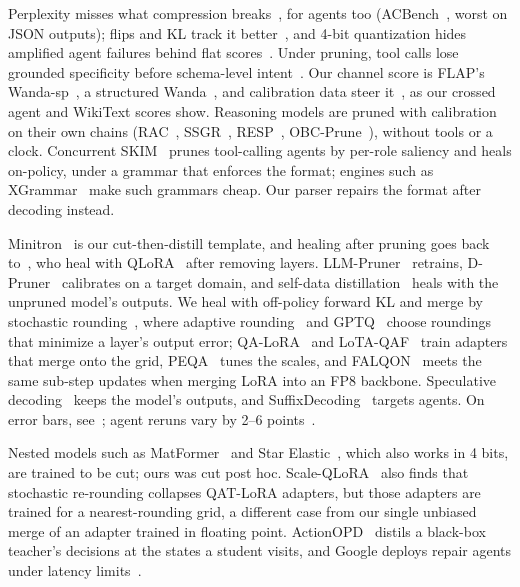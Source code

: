 \documentclass[10pt,twocolumn]{article}
\makeatletter
\renewcommand\paragraph{\@startsection{paragraph}{4}{\z@}{1.4ex \@plus .5ex \@minus .2ex}{-1em}{\normalfont\normalsize\bfseries}}
\makeatother
\begin{document}
Perplexity misses what compression breaks~\citep{jaiswal2023compressing}, for agents too
(ACBench~\citep{dong2025compressed}, worst on JSON outputs); flips and KL track it better~\citep{dutta2024accuracy},
and 4-bit quantization hides amplified agent failures behind flat scores~\citep{jang2026flat}. Under pruning, tool
calls lose grounded specificity before schema-level intent~\citep{zhang2026breaks}. Our channel score is FLAP's
Wanda-sp~\citep{an2023fluctuation}, a structured Wanda~\citep{sun2023simple}, and calibration data steer
it~\citep{williams2024impact,ji2025beware}, as our crossed agent and WikiText scores show. Reasoning models are pruned
with calibration on their own chains (RAC~\citep{lucas2025reasoning}, SSGR~\citep{xiang2025think},
RESP~\citep{wang2025think}, OBC-Prune~\citep{nguyen2026obcprune}), without tools or a clock. Concurrent
SKIM~\citep{choi2026skim} prunes tool-calling agents by per-role saliency and heals on-policy, under a grammar that
enforces the format; engines such as XGrammar~\citep{dong2024xgrammar} make such grammars cheap. Our parser repairs
the format after decoding instead.

Minitron~\citep{muralidharan2024compact} is our cut-then-distill template, and healing after pruning goes back
to~\citet{gromov2024unreasonable}, who heal with QLoRA~\citep{dettmers2023qlora} after removing layers.
LLM-Pruner~\citep{ma2023llmpruner} retrains, D-Pruner~\citep{zhang2024pruning} calibrates on a target domain, and
self-data distillation~\citep{thangarasa2024selfdata} heals with the unpruned model's outputs. We heal with off-policy
forward KL \citep[on-policy:][]{agarwal2023onpolicy,gu2023minillm} and merge by stochastic
rounding~\citep{gupta2015deep}, where adaptive rounding~\citep{nagel2020up} and GPTQ~\citep{frantar2022gptq} choose
roundings that minimize a layer's output error; QA-LoRA~\citep{xu2023qalora} and LoTA-QAF~\citep{chen2025lotaqaf}
train adapters that merge onto the grid, PEQA~\citep{kim2023memory} tunes the scales, and FALQON~\citep{choi2025falqon}
meets the same sub-step updates when merging LoRA into an FP8 backbone. Speculative
decoding~\citep{leviathan2022speculative,chen2023accelerating} keeps the model's outputs, and
SuffixDecoding~\citep{oliaro2024suffixdecoding} targets agents. On error bars, see~\citet{miller2024adding}; agent
reruns vary by 2--6 points~\citep{bjarnason2026randomness}.

\paragraph{Further related work.} Nested models such as MatFormer~\citep{devvrit2023matformer} and Star
Elastic~\citep{taghibakhshi2026starelastic}, which also works in 4 bits, are trained to be cut; ours was cut post hoc.
Scale-QLoRA~\citep{li2026scaleqlora} also finds that stochastic re-rounding collapses QAT-LoRA adapters, but those
adapters are trained for a nearest-rounding grid, a different case from our single unbiased merge of an adapter
trained in floating point. ActionOPD~\citep{yuan2026actionopd} distils a black-box teacher's decisions at the states a
student visits, and Google deploys repair agents under latency limits~\citep{ziftci2026catching}.
\end{document}
